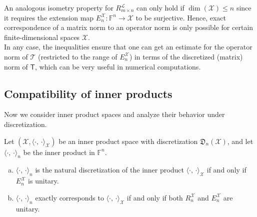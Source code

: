 \documentclass[a4paper]{paper}
\newcommand{\Discr}{\mathfrak{D}}
\newcommand{\Spc}[1]{\mathscr{#1}}
\newcommand{\Field}{\mathbb{F}}
\newcommand{\Op}[1]{\mathcal{#1}}
\newcommand{\DiscOp}[1]{\mathsf{#1}}
\newcommand*{\EXT}[2]{\ensuremath{E_{#1}^{#2}}}
\newcommand*{\REST}[2]{\ensuremath{R_{#1}^{#2}}}
\newcommand*{\RnX}{\ensuremath{\REST{n}{\Spc{X}}}}
\newcommand*{\EnX}{\ensuremath{\EXT{n}{\Spc{X}}}}
\DeclareMathOperator{\DIM}{dim}
\newcommand*{\INNER}[2]{\ensuremath{\langle #1,\,#2\rangle}}
\begin{document}
\begin{remark}
 \label{remark:prop:norm:op_norm_corresp}
 An analogous isometry property for $\REST{m\times n}{\Spc{L}}$ can only hold if $\DIM(\Spc{X}) \leq n$ 
 since it requires the extension map $\EnX \colon \Field^n \to \Spc{X}$ to be surjective. Hence, exact correspondence 
 of a matrix norm to an operator norm is only possible for certain finite-dimensional spaces $\Spc{X}$.\\
 In any case, the inequalities ensure that one can get an estimate for the operator norm of $\Op{T}$ (restricted to the 
 range of $\EnX$) in terms of the discretized (matrix) norm of $\DiscOp{T}$, which can be very useful in numerical 
 computations.
\end{remark}



\subsection{Compatibility of inner products}
\label{subsec:prop:inner}

Now we consider inner product spaces and analyze their behavior under discretization.

\begin{lemma}
 \label{lemma:prop:inner:natural_corresp}
 Let $(\Spc{X}, \INNER{\cdot}{\cdot}_{\Spc{X}})$ be an inner product space with discretization $\Discr_n(\Spc{X})$, and 
 let $\INNER{\cdot}{\cdot}_n$ be the inner product in $\Field^n$.
 \begin{enumerate}[(a)]
  \item \label{lemma:prop:inner:natural_corresp:a_natural}
  $\INNER{\cdot}{\cdot}_n$ is the natural discretization of the inner product $\INNER{\cdot}{\cdot}_{\Spc{X}}$ if and 
  only if $\EnX$ is unitary.
  
  \item \label{lemma:prop:inner:natural_corresp:b_corresp}
  $\INNER{\cdot}{\cdot}_n$ exactly corresponds to $\INNER{\cdot}{\cdot}_{\Spc{X}}$ if and only if both $\RnX$ and 
  $\EnX$ are unitary.
 \end{enumerate}
\end{lemma}
\end{document}
